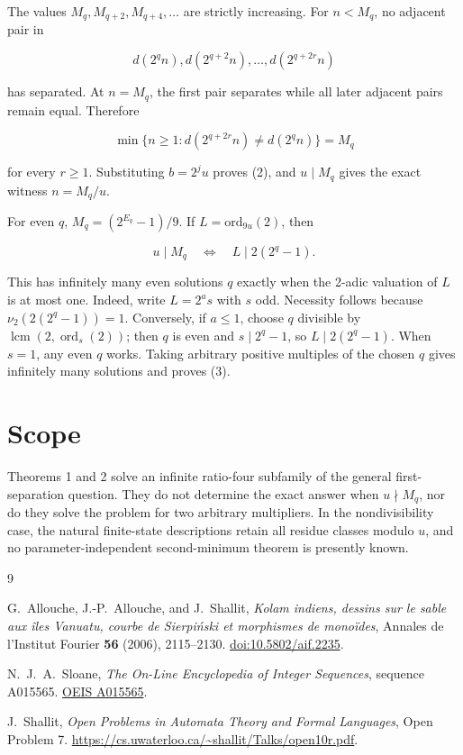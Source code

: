 \documentclass[11pt]{article}
\numberwithin{equation}{section}
\begin{document}
The values $M_q,M_{q+2},M_{q+4},\ldots$ are strictly increasing. For $n<M_q$, no adjacent
pair in

\[
d(2^qn),d(2^{q+2}n),\ldots,d(2^{q+2r}n)
\]

has separated. At $n=M_q$, the first pair separates while all later adjacent pairs remain equal.
Therefore

\[
\min\{n\geq1:d(2^{q+2r}n)\neq d(2^qn)\}=M_q
\]

for every $r\geq1$. Substituting $b=2^ju$ proves (2), and $u\mid M_q$ gives the exact witness
$n=M_q/u$.

For even $q$, $M_q=(2^{E_q}-1)/9$. If $L=\mathrm{ord}_{9u}(2)$, then

\[
u\mid M_q\quad\Longleftrightarrow\quad L\mid2(2^q-1).
\]

This has infinitely many even solutions $q$ exactly when the 2-adic valuation of $L$ is at most
one. Indeed, write $L=2^as$ with $s$ odd. Necessity follows because
$\nu_2(2(2^q-1))=1$. Conversely, if $a\leq1$, choose $q$ divisible by
$\operatorname{lcm}(2,\operatorname{ord}_s(2))$; then $q$ is even and
$s\mid2^q-1$, so $L\mid2(2^q-1)$. When $s=1$, any even $q$ works. Taking arbitrary positive
multiples of the chosen $q$ gives infinitely many solutions and proves (3).

\section{Scope}


Theorems 1 and 2 solve an infinite ratio-four subfamily of the general first-separation question.
They do not determine the exact answer when $u\nmid M_q$, nor do they solve the problem for two
arbitrary multipliers. In the nondivisibility case, the natural finite-state descriptions retain all
residue classes modulo $u$, and no parameter-independent second-minimum theorem is presently known.

\begin{thebibliography}{9}
\footnotesize
\raggedright

G.~Allouche, J.-P.~Allouche, and J.~Shallit,
\emph{Kolam indiens, dessins sur le sable aux \^iles Vanuatu, courbe de Sierpi\'nski et morphismes de mono\"ides},
Annales de l'Institut Fourier \textbf{56} (2006), 2115--2130.
\href{https://doi.org/10.5802/aif.2235}{doi:10.5802/aif.2235}.

N.~J.~A.~Sloane,
\emph{The On-Line Encyclopedia of Integer Sequences}, sequence A015565.
\href{https://oeis.org/A015565}{OEIS A015565}.

J.~Shallit,
\emph{Open Problems in Automata Theory and Formal Languages}, Open Problem 7.
\url{https://cs.uwaterloo.ca/~shallit/Talks/open10r.pdf}.

\end{thebibliography}
\end{document}
